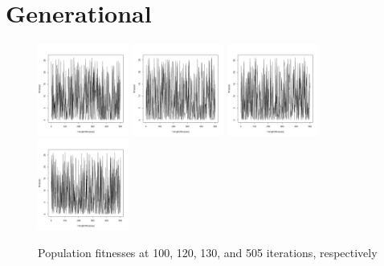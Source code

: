 \documentclass[12pt]{article}
\begin{document}
\section{Generational}
\begin{figure}[!h]
        \begin{center}
		\includegraphics[width=30mm]{images/gen/ind_101.pdf}
		\includegraphics[width=30mm]{images/gen/ind_120.pdf}
		\includegraphics[width=30mm]{images/gen/ind_130.pdf}
		\includegraphics[width=30mm]{images/gen/ind_505.pdf}
               	\caption{Population fitnesses at 100, 120, 130, and 505 iterations, respectively}
                \label{ss_pop_fit}
        \end{center}
\end{figure}
\end{document}
